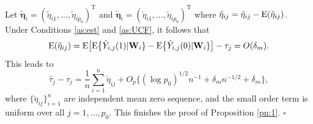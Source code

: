 \documentclass[12pt]{article}
\def\nn{\nonumber}
\def\T{{ \mathrm{\scriptscriptstyle T} }}
\theoremstyle{definition}
\newcommand{\E}{\rm E}
\newcommand{\bW}{{\mathbf W}}
\newcommand{\bfeta}  {\boldsymbol{\eta}}
\newcommand{\bXi}{\boldsymbol{\Xi}}
\begin{document}
Let $\tilde{\bfeta}_i = (\tilde{\eta}_{i1}, \ldots, \tilde{\eta}_{i p_0})^{\T}$ and $\check{\bfeta}_i = (\check{\eta}_{i1}, \ldots, \check{\eta}_{i p_0})^{\T}$ where $\check{\eta}_{ij} = \tilde{\eta}_{ij} - {\E}(\tilde{\eta}_{ij})$. %
Under Conditions \ref{as:est} and \ref{as:UCF}, it follows that
$${\E}(\tilde{\eta}_{ij}) = {\E}\big[ {\E}\big\{\hat{Y}_{i,j}(1) | \bW_i\} - {\E}\big\{\hat{Y}_{i,j}(0) | \bW_i\} \big] - \tau_j = O(\delta_m).$$
This leads to
$$\hat{\tau}_{j} - \tau_{j}
= 
\frac{1}{n}\sum_{i = 1}^{n} \check{\eta}_{ij}
+ 
O_{p}\{(\log p_0)^{1/2}n^{-1} + \delta_m n^{-1/2} + \delta_m\},$$
where $\{\check{\eta}_{ij}\}_{i = 1}^{n}$ are independent mean zero sequence, and the small order term is uniform over all $j = 1, \ldots, p_0$.
This finishes the proof of Proposition \ref{pn:1}. $\square$
\end{document}
